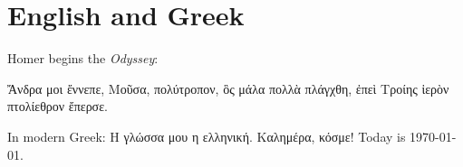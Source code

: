 \documentclass{article}
\begin{document}
\section{English and Greek}
Homer begins the \emph{Odyssey}:
\begin{greek}
Ἄνδρα μοι ἔννεπε, Μοῦσα, πολύτροπον, ὃς μάλα πολλὰ πλάγχθη, ἐπεὶ Τροίης ἱερὸν
πτολίεθρον ἔπερσε.
\end{greek}
In modern Greek: \textgreek{Η γλώσσα μου η ελληνική. Καλημέρα, κόσμε!}
Today is \today.
\end{document}
